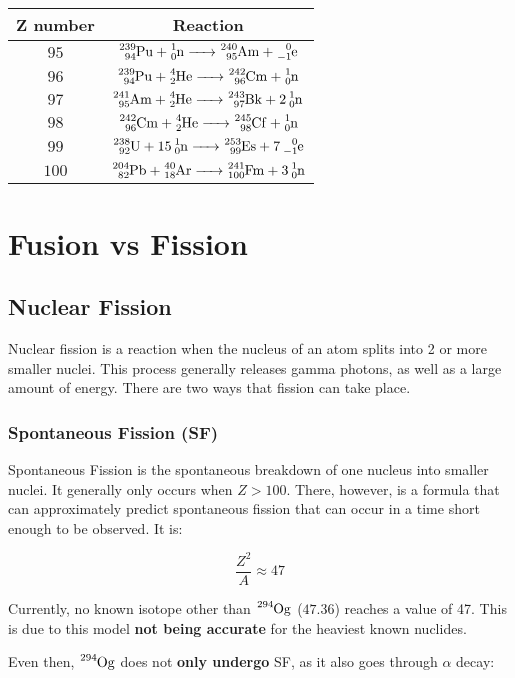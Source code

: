 \documentclass{article}
\begin{document}
\begin{multicols*}{2}
    \begin{tabular}{|c|c|}
      \hline
      Z number & Reaction \\
      \hline
      $95$ & $\ce{^{239}_{94}Pu + ^1_0n -> ^{240}_{95}Am + ^0_{-1}e}$         \\
      $96$ & $\ce{^{239}_{94}Pu + ^4_2He -> ^{242}_{96}Cm + ^1_0n}$           \\
      $97$ & $\ce{^{241}_{95}Am + ^4_2He -> ^{243}_{97}Bk + 2 ^1_0n}$         \\
      $98$ & $\ce{^{242}_{96}Cm + ^4_2He -> ^{245}_{98}Cf + ^1_0n}$           \\
      $99$ & $\ce{^{238}_{92}U + 15 ^1_0n -> ^{253}_{99}Es + 7 ^0_{-1}e}$     \\
      $100$ & $\ce{^{204}_{82}Pb + ^{40}_{18}Ar -> ^{241}_{100}Fm + 3 ^1_0n}$ \\
      \hline
    \end{tabular}

    \section{Fusion vs Fission}
    \subsection{Nuclear Fission}
    Nuclear fission is a reaction when the nucleus of an atom splits into 2
    or more smaller nuclei. This process generally releases gamma photons,
    as well as a large amount of energy. There are two ways that fission can
    take place.

    \subsubsection{Spontaneous Fission (SF)}
    Spontaneous Fission is the spontaneous breakdown of one nucleus into
    smaller nuclei. It generally only occurs when $Z > 100$. There, however,
    is a formula that can approximately predict spontaneous fission that can
    occur in a time short enough to be observed. It is:

    \[
      \frac{Z^2}{A} \approx 47
    \]

    Currently, no known isotope other than $\ce{^{294}Og}$ ($47.36$)
    reaches a value of 47. This is due to this model \textbf{not being accurate}
    for the heaviest known nuclides.

    Even then, $\ce{^{294}Og}$ does not \textbf{only undergo} SF, as it also
    goes through $\alpha$ decay:


\end{multicols*}
\end{document}
